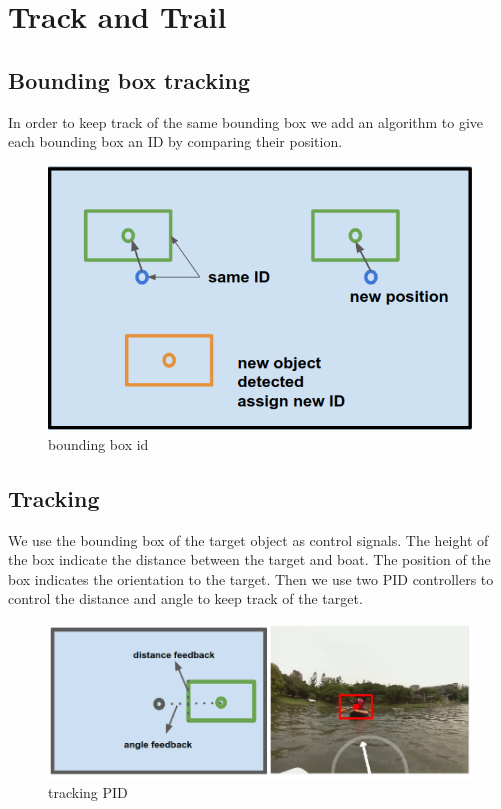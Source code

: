 \section{Track and Trail}

\subsection{Bounding box tracking}

In order to keep track of the same bounding box we add an algorithm to give each bounding box an ID by comparing their position.

\begin{figure}[ht]
    \includegraphics[width=1\columnwidth]{images/bbox.png}
    \centering
    \caption{bounding box id}
    \label{figure:bbox}
\end{figure}

\subsection{Tracking}

We use the bounding box of the target object as control signals. The height of the box indicate the distance between the target and boat. The position of the box indicates the orientation to the target. Then we use two PID controllers to control the distance and angle to keep track of the target.

\begin{figure}[ht]
    \includegraphics[width=1\columnwidth]{images/tracking.png}
    \centering
    \caption{tracking PID}
    \label{figure:tracking}
\end{figure}